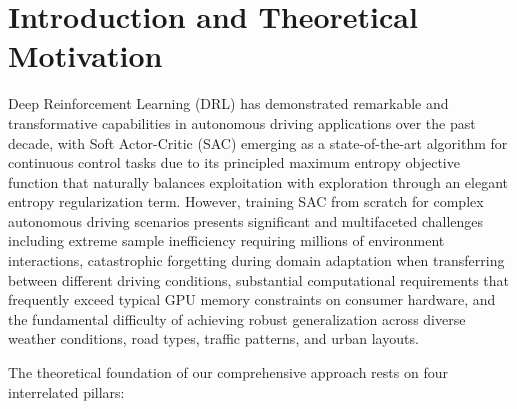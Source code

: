 \documentclass[10pt,twocolumn,letterpaper]{article}
\begin{document}
\begin{abstract}
\vspace{0.2cm}
\noindent\textbf{Index Terms---} Reinforcement Learning, Soft Actor-Critic, Autonomous Driving, CARLA Simulator, Transfer Learning, Multi-Modal Sensing, Policy Optimization, Entropy Regularization, Deep Q-Networks, Continuous Control, Sample Efficiency, Curriculum Learning, Domain Adaptation.
\end{abstract}

\vspace{0.5cm}

\section{Introduction and Theoretical Motivation}

Deep Reinforcement Learning (DRL) has demonstrated remarkable and transformative capabilities in autonomous driving applications over the past decade, with Soft Actor-Critic (SAC) emerging as a state-of-the-art algorithm for continuous control tasks due to its principled maximum entropy objective function that naturally balances exploitation with exploration through an elegant entropy regularization term. However, training SAC from scratch for complex autonomous driving scenarios presents significant and multifaceted challenges including extreme sample inefficiency requiring millions of environment interactions, catastrophic forgetting during domain adaptation when transferring between different driving conditions, substantial computational requirements that frequently exceed typical GPU memory constraints on consumer hardware, and the fundamental difficulty of achieving robust generalization across diverse weather conditions, road types, traffic patterns, and urban layouts.

The theoretical foundation of our comprehensive approach rests on four interrelated pillars:
\end{document}
